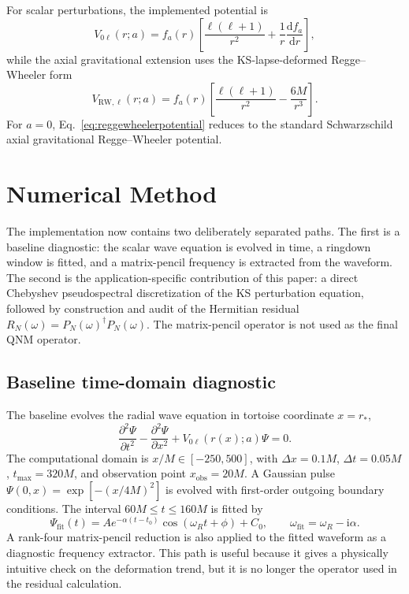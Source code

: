 \documentclass[10pt,letterpaper,twocolumn]{article}
\newcommand{\dd}{\mathrm{d}}
\newcommand{\ii}{\mathrm{i}}
\begin{document}
For scalar perturbations, the implemented potential is
\begin{equation}
V_{0\ell}(r;a)=f_a(r)\left[\frac{\ell(\ell+1)}{r^2}+\frac{1}{r}\frac{\dd f_a}{\dd r}\right],
\label{eq:scalarpotential}
\end{equation}
while the axial gravitational extension uses the KS-lapse-deformed Regge--Wheeler form
\begin{equation}
V_{\mathrm{RW},\ell}(r;a)=f_a(r)\left[\frac{\ell(\ell+1)}{r^2}-\frac{6M}{r^3}\right].
\label{eq:reggewheelerpotential}
\end{equation}
For \(a=0\), Eq.~\eqref{eq:reggewheelerpotential} reduces to the standard Schwarzschild axial gravitational Regge--Wheeler potential.

\section{Numerical Method}

The implementation now contains two deliberately separated paths. The first is a baseline diagnostic: the scalar wave equation is evolved in time, a ringdown window is fitted, and a matrix-pencil frequency is extracted from the waveform. The second is the application-specific contribution of this paper: a direct Chebyshev pseudospectral discretization of the KS perturbation equation, followed by construction and audit of the Hermitian residual \(R_N(\omega)=P_N(\omega)^\dagger P_N(\omega)\). The matrix-pencil operator is not used as the final QNM operator.

\subsection{Baseline time-domain diagnostic}

The baseline evolves the radial wave equation in tortoise coordinate \(x=r_*\),
\begin{equation}
\frac{\partial^2\Psi}{\partial t^2}
-
\frac{\partial^2\Psi}{\partial x^2}
+
V_{0\ell}(r(x);a)\Psi=0.
\label{eq:timedomain}
\end{equation}
The computational domain is \(x/M\in[-250,500]\), with \(\Delta x=0.1M\), \(\Delta t=0.05M\), \(t_{\max}=320M\), and observation point \(x_{\mathrm{obs}}=20M\). A Gaussian pulse \(\Psi(0,x)=\exp[-(x/4M)^2]\) is evolved with first-order outgoing boundary conditions. The interval \(60M\leq t\leq160M\) is fitted by
\begin{equation}
\Psi_{\mathrm{fit}}(t)=A e^{-\alpha(t-t_0)}
\cos(\omega_R t+\phi)+C_0,
\qquad
\omega_{\mathrm{fit}}=\omega_R-\ii\alpha.
\end{equation}
A rank-four matrix-pencil reduction is also applied to the fitted waveform as a diagnostic frequency extractor. This path is useful because it gives a physically intuitive check on the deformation trend, but it is no longer the operator used in the residual calculation.
\end{document}

